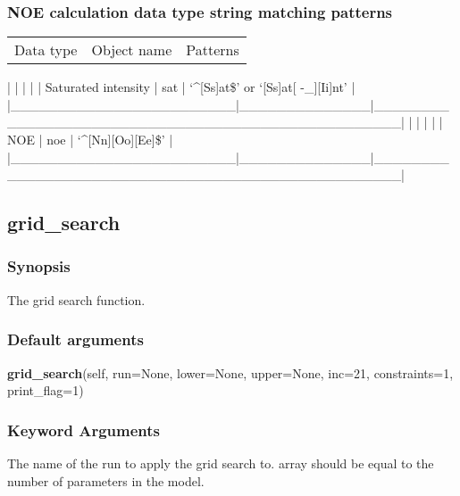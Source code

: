 \subsubsection{NOE calculation data type string matching patterns}



\begin{tabular}{ccc}
Data type & Object name & Patterns \\
\end{tabular}
|                        |              |                                                  |
| Saturated intensity    | sat          | `\^{}[Ss]at\$' or `[Ss]at[ -\_][Ii]nt'                |
|\_\_\_\_\_\_\_\_\_\_\_\_\_\_\_\_\_\_\_\_\_\_\_\_|\_\_\_\_\_\_\_\_\_\_\_\_\_\_|\_\_\_\_\_\_\_\_\_\_\_\_\_\_\_\_\_\_\_\_\_\_\_\_\_\_\_\_\_\_\_\_\_\_\_\_\_\_\_\_\_\_\_\_\_\_\_\_\_\_|
|                        |              |                                                  |
| NOE                    | noe          | `\^{}[Nn][Oo][Ee]\$'                                 |
|\_\_\_\_\_\_\_\_\_\_\_\_\_\_\_\_\_\_\_\_\_\_\_\_|\_\_\_\_\_\_\_\_\_\_\_\_\_\_|\_\_\_\_\_\_\_\_\_\_\_\_\_\_\_\_\_\_\_\_\_\_\_\_\_\_\_\_\_\_\_\_\_\_\_\_\_\_\_\_\_\_\_\_\_\_\_\_\_\_|


\newpage

\subsection{grid\_search}


\subsubsection{Synopsis}

The grid search function.

\subsubsection{Default arguments}

\textsf{\textbf{grid\_search}(self, run=None, lower=None, upper=None, inc=21, constraints=1, print\_flag=1)}


\subsubsection{Keyword Arguments}

  The name of the run to apply the grid search to.
array should be equal to the number of parameters in the model.

